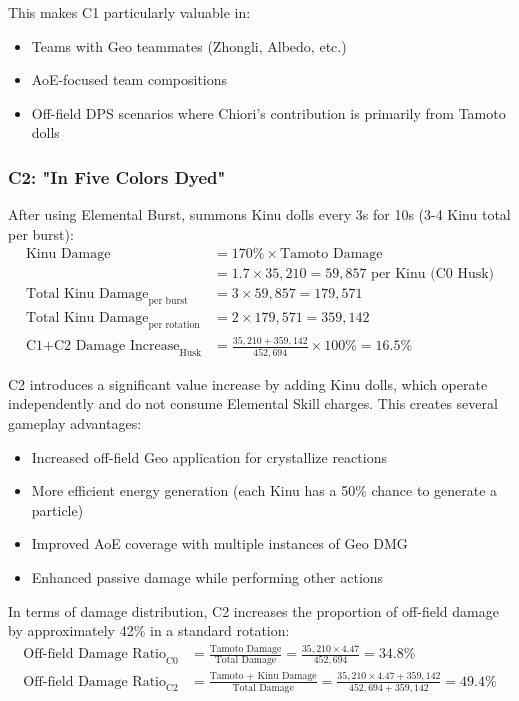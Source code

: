\documentclass[12pt,a4paper]{article}
\begin{document}
This makes C1 particularly valuable in:
\begin{itemize}
    \item Teams with Geo teammates (Zhongli, Albedo, etc.)
    \item AoE-focused team compositions
    \item Off-field DPS scenarios where Chiori's contribution is primarily from Tamoto dolls
\end{itemize}

\subsubsection{C2: "In Five Colors Dyed"}
After using Elemental Burst, summons Kinu dolls every 3s for 10s (3-4 Kinu total per burst):
\begin{align}
\text{Kinu Damage} &= 170\% \times \text{Tamoto Damage} \\
&= 1.7 \times 35,210 = 59,857 \text{ per Kinu (C0 Husk)} \\
\text{Total Kinu Damage}_{\text{per burst}} &= 3 \times 59,857 = 179,571 \\
\text{Total Kinu Damage}_{\text{per rotation}} &= 2 \times 179,571 = 359,142 \\
\text{C1+C2 Damage Increase}_{\text{Husk}} &= \frac{35,210 + 359,142}{452,694} \times 100\% = 16.5\%
\end{align}

C2 introduces a significant value increase by adding Kinu dolls, which operate independently and do not consume Elemental Skill charges. This creates several gameplay advantages:
\begin{itemize}
    \item Increased off-field Geo application for crystallize reactions
    \item More efficient energy generation (each Kinu has a 50\% chance to generate a particle)
    \item Improved AoE coverage with multiple instances of Geo DMG
    \item Enhanced passive damage while performing other actions
\end{itemize}

In terms of damage distribution, C2 increases the proportion of off-field damage by approximately 42\% in a standard rotation:
\begin{align}
\text{Off-field Damage Ratio}_{\text{C0}} &= \frac{\text{Tamoto Damage}}{\text{Total Damage}} = \frac{35,210 \times 4.47}{452,694} = 34.8\% \\
\text{Off-field Damage Ratio}_{\text{C2}} &= \frac{\text{Tamoto + Kinu Damage}}{\text{Total Damage}} = \frac{35,210 \times 4.47 + 359,142}{452,694 + 359,142} = 49.4\%
\end{align}
\end{document}
